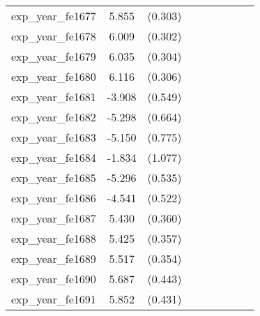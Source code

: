{\begin{tabular}{l*{4}{cc}}
exp\_year\_fe1677&    5.855\sym{***}&  (0.303)&                  &         &                  &         &                  &         \\
exp\_year\_fe1678&    6.009\sym{***}&  (0.302)&                  &         &                  &         &                  &         \\
exp\_year\_fe1679&    6.035\sym{***}&  (0.304)&                  &         &                  &         &                  &         \\
exp\_year\_fe1680&    6.116\sym{***}&  (0.306)&                  &         &                  &         &                  &         \\
exp\_year\_fe1681&   -3.908\sym{***}&  (0.549)&                  &         &                  &         &                  &         \\
exp\_year\_fe1682&   -5.298\sym{***}&  (0.664)&                  &         &                  &         &                  &         \\
exp\_year\_fe1683&   -5.150\sym{***}&  (0.775)&                  &         &                  &         &                  &         \\
exp\_year\_fe1684&   -1.834         &  (1.077)&                  &         &                  &         &                  &         \\
exp\_year\_fe1685&   -5.296\sym{***}&  (0.535)&                  &         &                  &         &                  &         \\
exp\_year\_fe1686&   -4.541\sym{***}&  (0.522)&                  &         &                  &         &                  &         \\
exp\_year\_fe1687&    5.430\sym{***}&  (0.360)&                  &         &                  &         &                  &         \\
exp\_year\_fe1688&    5.425\sym{***}&  (0.357)&                  &         &                  &         &                  &         \\
exp\_year\_fe1689&    5.517\sym{***}&  (0.354)&                  &         &                  &         &                  &         \\
exp\_year\_fe1690&    5.687\sym{***}&  (0.443)&                  &         &                  &         &                  &         \\
exp\_year\_fe1691&    5.852\sym{***}&  (0.431)&                  &         &                  &         &                  &         \\

\end{tabular}}

